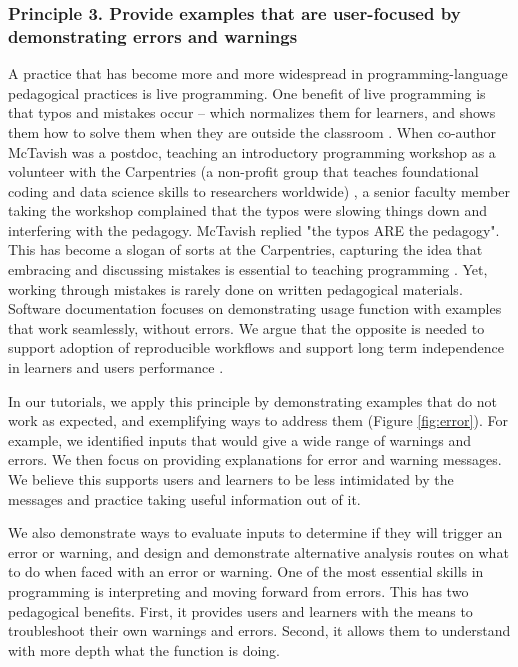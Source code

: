 \documentclass[12pt]{article}
\begin{document}
\subsubsection*{Principle 3. Provide examples that are user-focused by demonstrating errors and warnings}


A practice that has become more and more widespread in programming-language pedagogical practices
is live programming.
One benefit of live programming is that typos and mistakes occur -- which normalizes
them for learners, and shows them how to solve them when they are outside the
classroom \citep{shannon2015live, nederbragt2020ten}.
When co-author McTavish was a postdoc, teaching an introductory programming workshop as a volunteer
with the Carpentries (a non-profit group that teaches foundational coding and
 data science skills to researchers worldwide) \citep{wilson2006swc, SWCwebsite},
a senior faculty member taking the workshop
complained that the typos were slowing things down and interfering with the pedagogy.
McTavish replied "the typos ARE the pedagogy".
This has become a slogan of sorts at the Carpentries, capturing the idea that embracing
and discussing mistakes is essential to teaching programming \citep{wilson2019teaching}.
Yet, working through mistakes is rarely done on written pedagogical materials.
Software documentation focuses on demonstrating usage function with examples that
work seamlessly, without errors. We argue that the opposite is needed to support
adoption of reproducible workflows and support long term independence in learners
and users performance \citep{gaspar2007restoring, steele2014error}.

In our tutorials, we apply this principle by demonstrating examples that do not work
as expected, and exemplifying ways to address them (Figure \ref{fig:error}).
For example, we identified inputs that would give
a wide range of warnings and errors. We then focus on providing explanations for
error and warning messages. We believe this supports users and learners to be less
intimidated by the messages and practice taking useful information out of it.

We also demonstrate ways to evaluate inputs to determine if they will trigger an
error or warning, and design and demonstrate alternative analysis routes on what
to do when faced with an error or warning.
One of the most essential skills in programming is interpreting and moving forward
from errors.
This has two pedagogical benefits. First, it provides users and learners with the
means to troubleshoot their own warnings and errors. Second, it allows them to
understand with more depth what the function is doing.
\end{document}
